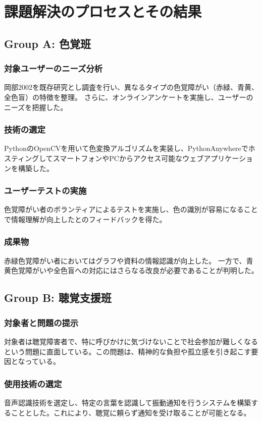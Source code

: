 \section{課題解決のプロセスとその結果}
\subsection{Group A: 色覚班}
\subsubsection{対象ユーザーのニーズ分析}
岡部2002\cite{okabe2002color}を既存研究とし調査を行い、異なるタイプの色覚障がい（赤緑、青黄、全色盲）の特徴を整理。
さらに、オンラインアンケートを実施し、ユーザーのニーズを把握した。
\subsubsection{技術の選定}
PythonのOpenCVを用いて色変換アルゴリズムを実装し、PythonAnywhereでホスティングしてスマートフォンやPCからアクセス可能なウェブアプリケーションを構築した。
\subsubsection{ユーザーテストの実施}
色覚障がい者のボランティアによるテストを実施し、色の識別が容易になることで情報理解が向上したとのフィードバックを得た。
\subsubsection{成果物}
赤緑色覚障がい者においてはグラフや資料の情報認識が向上した。
一方で、青黄色覚障がいや全色盲への対応にはさらなる改良が必要であることが判明した。

\subsection{Group B: 聴覚支援班}
\subsubsection{対象者と問題の提示}
対象者は聴覚障害者で、特に呼びかけに気づけないことで社会参加が難しくなるという問題に直面している。この問題は、精神的な負担や孤立感を引き起こす要因となっている。
\subsubsection{使用技術の選定}
音声認識技術を選定し、特定の言葉を認識して振動通知を行うシステムを構築することとした。これにより、聴覚に頼らず通知を受け取ることが可能となる。
